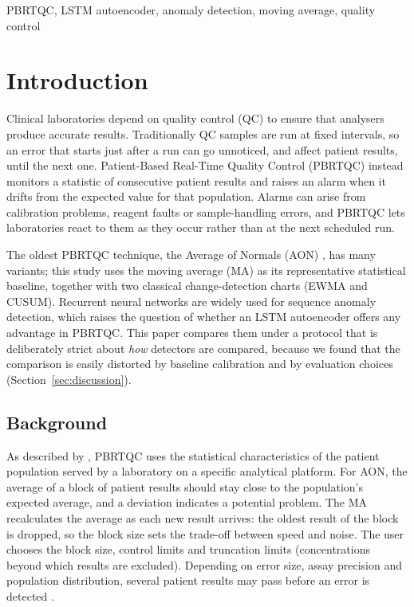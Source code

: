 \documentclass[conference]{IEEEtran}
\begin{document}
\begin{IEEEkeywords}
PBRTQC, LSTM autoencoder, anomaly detection, moving average, quality control
\end{IEEEkeywords}

\section{Introduction}
Clinical laboratories depend on quality control (QC) to ensure that analysers produce accurate results. Traditionally QC samples are run at fixed intervals, so an error that starts just after a run can go unnoticed, and affect patient results, until the next one. Patient-Based Real-Time Quality Control (PBRTQC) instead monitors a statistic of consecutive patient results and raises an alarm when it drifts from the expected value for that population. Alarms can arise from calibration problems, reagent faults or sample-handling errors, and PBRTQC lets laboratories react to them as they occur rather than at the next scheduled run.

The oldest PBRTQC technique, the Average of Normals (AON) \cite{Cembrowski1984}, has many variants; this study uses the moving average (MA) as its representative statistical baseline, together with two classical change-detection charts (EWMA and CUSUM). Recurrent neural networks are widely used for sequence anomaly detection, which raises the question of whether an LSTM autoencoder offers any advantage in PBRTQC. This paper compares them under a protocol that is deliberately strict about \emph{how} detectors are compared, because we found that the comparison is easily distorted by baseline calibration and by evaluation choices (Section~\ref{sec:discussion}).

\subsection{Background}
As described by \cite{Badrick2020}, PBRTQC uses the statistical characteristics of the patient population served by a laboratory on a specific analytical platform. For AON, the average of a block of patient results should stay close to the population's expected average, and a deviation indicates a potential problem. The MA recalculates the average as each new result arrives: the oldest result of the block is dropped, so the block size sets the trade-off between speed and noise. The user chooses the block size, control limits and truncation limits (concentrations beyond which results are excluded). Depending on error size, assay precision and population distribution, several patient results may pass before an error is detected \cite{Bietenbeck2020}.
\end{document}
